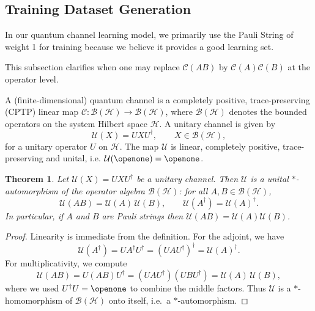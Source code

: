 \documentclass[%
 reprint,
superscriptaddress,
 amsmath,amssymb,
 aps,
]{revtex4-2}
\newtheorem{theorem}{Theorem}[section]
\begin{document}
\subsection{Training Dataset Generation}
\label{sec:Training_dataset_generation}

In our quantum channel learning model, we primarily use the Pauli String of weight 1 for training because we believe it provides a good learning set.

This subsection clarifies when one may replace $\mathcal{C}(AB)$ by $\mathcal{C}(A)\mathcal{C}(B)$ at the operator level.

A (finite-dimensional) quantum channel is a completely positive,
trace-preserving (CPTP) linear map
\(\mathcal{C}:\mathcal{B}(\mathcal{H})\to\mathcal{B}(\mathcal{H})\),
where $\mathcal{B}(\mathcal{H})$ denotes the bounded operators on the system Hilbert space $\mathcal{H}$. A unitary channel is given by
\begin{equation}
  \mathcal{U}(X) = U X U^{\dagger},
  \qquad X\in\mathcal{B}(\mathcal{H}),
\end{equation}
for a unitary operator $U$ on $\mathcal{H}$. The map $\mathcal{U}$ is linear, completely positive, trace-preserving
and unital, i.e. $\mathcal{U}(\openone)=\openone$.

\begin{theorem}
Let $\mathcal{U}(X)=UXU^{\dagger}$ be a unitary channel. Then
$\mathcal{U}$ is a unital $*$-automorphism of the operator algebra
$\mathcal{B}(\mathcal{H})$: for all $A,B\in\mathcal{B}(\mathcal{H})$,
\begin{equation}
  \mathcal{U}(AB)=\mathcal{U}(A)\,\mathcal{U}(B),
  \qquad
  \mathcal{U}(A^{\dagger})=\mathcal{U}(A)^{\dagger}.
\end{equation}
In particular, if $A$ and $B$ are Pauli strings then
$\mathcal{U}(AB)=\mathcal{U}(A)\mathcal{U}(B)$.
\end{theorem}

\begin{proof}
Linearity is immediate from the definition. For the adjoint, we have
\begin{equation}
  \mathcal{U}(A^{\dagger})
  = U A^{\dagger} U^{\dagger}
  = (UAU^{\dagger})^{\dagger}
  = \mathcal{U}(A)^{\dagger}.
\end{equation}
For multiplicativity, we compute
\begin{equation}
  \mathcal{U}(AB)
  = U (AB) U^{\dagger}
  = (UAU^{\dagger})(UBU^{\dagger})
  = \mathcal{U}(A)\,\mathcal{U}(B),
\end{equation}
where we used $U^{\dagger}U=\openone$ to combine the middle factors.
Thus $\mathcal{U}$ is a $*$-homomorphism of $\mathcal{B}(\mathcal{H})$
onto itself, i.e.\ a $*$-automorphism.
\end{proof}
\end{document}
